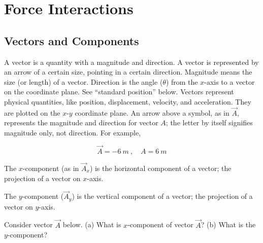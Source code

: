 \documentclass[main.tex]{subfiles}
\begin{document}
\section{Force Interactions}

\subsection{Vectors and Components}

A vector is a quantity with a magnitude and direction. A vector is represented by an arrow of a certain size, pointing in a certain direction. Magnitude means the size (or length) of a vector. Direction is the angle ($\theta$) from the $x$-axis to a vector on the coordinate plane. See ``standard position'' below. Vectors represent physical quantities, like position, displacement, velocity, and acceleration. They are plotted on the $x$-$y$ coordinate plane. An arrow above a symbol, as in $\vec{A}$, represents the magnitude and direction for vector $A$; the letter by itself signifies magnitude only, not direction. For example,

\begin{equation*}
    \vec{A} = \SI{-6}{m}\ , \hspace{1em} A = \SI{6}{m}
\end{equation*}


The $x$-component (as in  $\vec{A}_x$) is the horizontal component of a vector; the projection of a vector on $x$-axis.


The $y$-component ($\vec{A}_y$) is the vertical component of a vector; the projection of a vector on $y$-axis.

\begin{example}
Consider vector $\vec{A}$ below. (a) What is $x$-component of vector $\vec{A}$? (b) What is the $y$-component?
\end{example}
\end{document}
